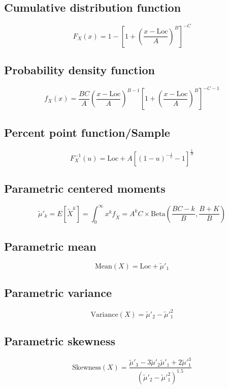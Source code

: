 \documentclass{article}
\begin{document}
\subsection{Cumulative distribution function}
\begin{equation*} F_{X}\left( x \right)=1-\left[ 1+\left( \frac{x-\text{Loc}}{A} \right)^{B} \right]^{-C} \end{equation*}
\subsection{Probability density function}
\begin{equation*} f_{X}\left( x \right)=\frac{BC}{A}\left( \frac{x-\text{Loc}}{A} \right)^{B-1}\left[ 1+\left( \frac{x-\text{Loc}}{A} \right)^{B} \right]^{-C-1} \end{equation*}
\subsection{Percent point function/Sample}
\begin{equation*} F^{-1}_{X}\left( u \right)=\text{Loc}+A\left[ (1-u)^{-\frac{1}{c}}-1 \right]^{\frac{1}{B}} \end{equation*}
\subsection{Parametric centered moments}
\begin{equation*} \tilde{\mu}'_{k}=E[\tilde{X}^k]=\int_{0}^{\infty}x^{k}f_{\tilde{X}}=A^{k}C\times \text{Beta}\left( \frac{BC-k}{B},\frac{B+K}{B} \right) \end{equation*}
\subsection{Parametric mean}
\begin{equation*} \mathrm{Mean}(X)=\text{Loc}+\tilde{\mu}'_{1} \end{equation*}
\subsection{Parametric variance}
\begin{equation*} \mathrm{Variance}(X)=\tilde{\mu}'_{2}-\tilde{\mu}'^{2}_{1} \end{equation*}
\subsection{Parametric skewness}
\begin{equation*} \mathrm{Skewness}(X) = \frac{\tilde{\mu}'_{3} - 3\tilde{\mu}'_{2}\tilde{\mu}'_{1} + 2\tilde{\mu}'^{3}_{1}}{(\tilde{\mu}'_{2}-\tilde{\mu}'^{2}_{1})^{1.5}} \end{equation*}
\end{document}
